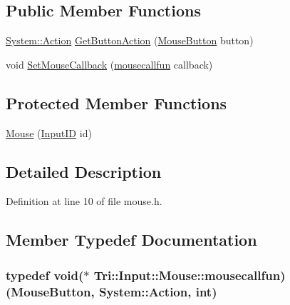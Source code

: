 \subsection*{Public Member Functions}
\begin{DoxyCompactItemize}
\item 
\hyperlink{namespace_tri_1_1_input_1_1_system_a79600e9f4ed835251eed1706ce96bed0}{System\+::\+Action} \hyperlink{class_tri_1_1_input_1_1_mouse_a7c94e7c24b8b7792021d58cceb78f89b}{Get\+Button\+Action} (\hyperlink{class_tri_1_1_input_1_1_mouse_a926c664faabb33e4fab8154520289d2d}{Mouse\+Button} button)
\item 
void \hyperlink{class_tri_1_1_input_1_1_mouse_a193562bc5a6f21f420c0aa32b64317a1}{Set\+Mouse\+Callback} (\hyperlink{class_tri_1_1_input_1_1_mouse_a41472f0b88d5fd25c219575da51e8e0b}{mousecallfun} callback)
\end{DoxyCompactItemize}
\subsection*{Protected Member Functions}
\begin{DoxyCompactItemize}
\item 
\hyperlink{class_tri_1_1_input_1_1_mouse_af4442e246b375684a579eddf12c85c7f}{Mouse} (\hyperlink{namespace_tri_1_1_input_ac94df02dceb9dbc5ca1512e9ded38154}{Input\+I\+D} id)
\end{DoxyCompactItemize}


\subsection{Detailed Description}


Definition at line 10 of file mouse.\+h.



\subsection{Member Typedef Documentation}
\hypertarget{class_tri_1_1_input_1_1_mouse_a41472f0b88d5fd25c219575da51e8e0b}{}
\subsubsection[{mousecallfun}]{\setlength{\rightskip}{0pt plus 5cm}typedef void($\ast$  Tri\+::\+Input\+::\+Mouse\+::mousecallfun) ({\bf Mouse\+Button}, {\bf System\+::\+Action}, int)}\label{class_tri_1_1_input_1_1_mouse_a41472f0b88d5fd25c219575da51e8e0b}


